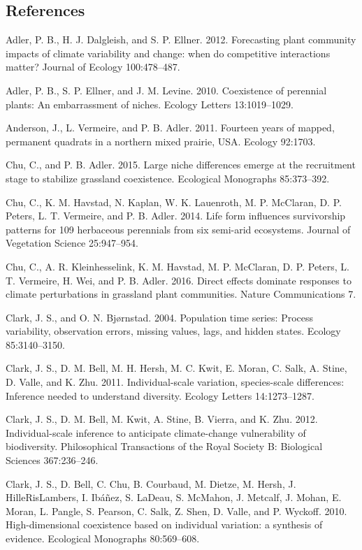 \documentclass[12pt,]{article}
\begin{document}
\newpage{}

\singlespace{}

\subsection{References}\label{references}

Adler, P. B., H. J. Dalgleish, and S. P. Ellner. 2012. Forecasting plant
community impacts of climate variability and change: when do competitive
interactions matter? Journal of Ecology 100:478--487.

Adler, P. B., S. P. Ellner, and J. M. Levine. 2010. Coexistence of
perennial plants: An embarrassment of niches. Ecology Letters
13:1019--1029.

Anderson, J., L. Vermeire, and P. B. Adler. 2011. Fourteen years of
mapped, permanent quadrats in a northern mixed prairie, USA. Ecology
92:1703.

Chu, C., and P. B. Adler. 2015. Large niche differences emerge at the
recruitment stage to stabilize grassland coexistence. Ecological
Monographs 85:373--392.

Chu, C., K. M. Havstad, N. Kaplan, W. K. Lauenroth, M. P. McClaran, D.
P. Peters, L. T. Vermeire, and P. B. Adler. 2014. Life form influences
survivorship patterns for 109 herbaceous perennials from six semi-arid
ecosystems. Journal of Vegetation Science 25:947--954.

Chu, C., A. R. Kleinhesselink, K. M. Havstad, M. P. McClaran, D. P.
Peters, L. T. Vermeire, H. Wei, and P. B. Adler. 2016. Direct effects
dominate responses to climate perturbations in grassland plant
communities. Nature Communications 7.

Clark, J. S., and O. N. Bj{ø}rnstad. 2004. Population time series:
Process variability, observation errors, missing values, lags, and
hidden states. Ecology 85:3140--3150.

Clark, J. S., D. M. Bell, M. H. Hersh, M. C. Kwit, E. Moran, C. Salk, A.
Stine, D. Valle, and K. Zhu. 2011. Individual-scale variation,
species-scale differences: Inference needed to understand diversity.
Ecology Letters 14:1273--1287.

Clark, J. S., D. M. Bell, M. Kwit, A. Stine, B. Vierra, and K. Zhu.
2012. Individual-scale inference to anticipate climate-change
vulnerability of biodiversity. Philosophical Transactions of the Royal
Society B: Biological Sciences 367:236--246.

Clark, J. S., D. Bell, C. Chu, B. Courbaud, M. Dietze, M. Hersh, J.
HilleRisLambers, I. Ib{á}{ñ}ez, S. LaDeau, S. McMahon, J. Metcalf, J.
Mohan, E. Moran, L. Pangle, S. Pearson, C. Salk, Z. Shen, D. Valle, and
P. Wyckoff. 2010. High-dimensional coexistence based on individual
variation: a synthesis of evidence. Ecological Monographs 80:569--608.
\end{document}

